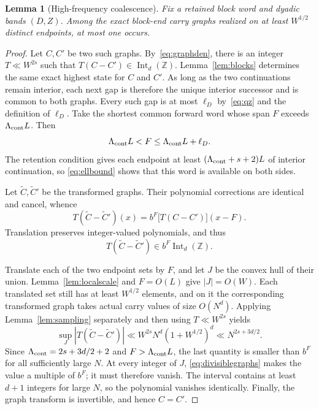 \documentclass[a4paper,10pt]{amsart}
\newtheorem{lemma}[theorem]{Lemma}
\theoremstyle{remark}
\newcommand{\Z}{\mathbb Z}
\newcommand{\Int}{\operatorname{Int}}
\begin{document}
\begin{lemma}[High-frequency coalescence]\label{lem:coalescence}
Fix a retained block word and dyadic bands $(D,Z)$. Among the exact block-end
carry graphs realized on at least $W^{1/2}$ distinct endpoints, at most one
occurs.
\end{lemma}

\begin{proof}
Let $C,C'$ be two such graphs. By~\eqref{eq:graphden}, there is an integer
$T\ll W^{2s}$ such that $T(C-C')\in\Int_d(\Z)$. Lemma~\ref{lem:blocks}
determines the same exact highest state for $C$ and $C'$. As long as the two
continuations remain interior, each next gap is therefore the unique
interior successor and is common to both graphs. Every such gap is at most
$\ell_D$ by~\eqref{eq:qz} and the definition of $\ell_D$. Take the shortest
common forward word whose span $F$ exceeds $\Lambda_{\rm cont}L$. Then
\[
 \Lambda_{\rm cont}L<F\le\Lambda_{\rm cont}L+\ell_D.
\]
The retention condition gives each endpoint at least
$(\Lambda_{\rm cont}+s+2)L$ of interior continuation, so
\eqref{eq:ellbound} shows that this word is available on both sides.

Let $\widetilde C,\widetilde C'$ be the transformed graphs. Their polynomial
corrections are identical and cancel, whence
\[
 T(\widetilde C-\widetilde C')(x)
 =b^F\bigl[T(C-C')\bigr](x-F).
\]
Translation preserves integer-valued polynomials, and thus
\begin{equation}\label{eq:divisiblegraphs}
 T(\widetilde C-\widetilde C')\in b^F\Int_d(\Z).
\end{equation}

Translate each of the two endpoint sets by $F$, and let $J$ be the convex
hull of their union. Lemma~\ref{lem:localscale} and $F=O(L)$ give
$|J|=O(W)$. Each translated set still has at least $W^{1/2}$ elements, and on
it the corresponding transformed graph takes actual carry values of size
$O(N^d)$. Applying Lemma~\ref{lem:sampling} separately and then using
$T\ll W^{2s}$ yields
\[
 \sup_J|T(\widetilde C-\widetilde C')|
 \ll W^{2s}N^d(1+W^{1/2})^d
 \ll N^{2s+3d/2}.
\]
Since $\Lambda_{\rm cont}=2s+3d/2+2$ and
$F>\Lambda_{\rm cont}L$, the last quantity is smaller than $b^F$ for all
sufficiently large $N$. At every integer of $J$,
\eqref{eq:divisiblegraphs} makes the value a multiple of $b^F$; it must
therefore vanish. The interval contains at least $d+1$ integers for large
$N$, so the polynomial vanishes identically. Finally, the graph transform is
invertible, and hence $C=C'$.
\end{proof}
\end{document}
